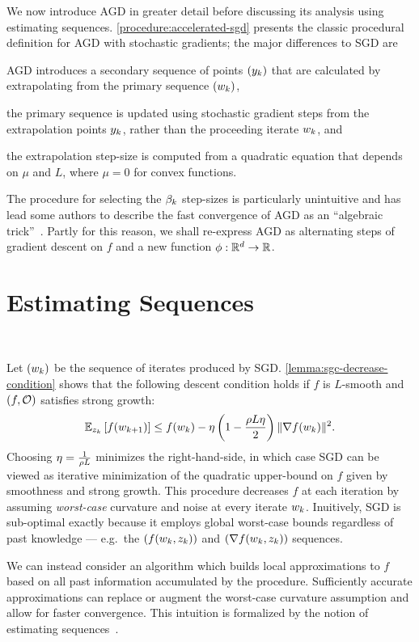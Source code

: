 We now introduce \ac{AGD} in greater detail before discussing its analysis using estimating sequences. 
\autoref{procedure:accelerated-sgd} presents the classic procedural definition for \ac{AGD} with stochastic gradients; the major differences to \ac{SGD} are
\begin{inparaenum}[(i)]
\item \ac{AGD} introduces a secondary sequence of points \( \seq{\yk} \) that are calculated by extrapolating from the primary sequence \( \seq{\wk} \),
\item the primary sequence is updated using stochastic gradient steps from the extrapolation points \( \yk \), rather than the proceeding iterate \( \wk \), and 
\item the extrapolation step-size is computed from a quadratic equation that depends on \( \mu \) and \( L \), where \( \mu = 0 \) for convex functions. 
\end{inparaenum}
The procedure for selecting the \( \betak \) step-sizes is particularly unintuitive and has lead some authors to describe the fast convergence of \ac{AGD} as an ``algebraic trick''~\citep{allen2014linear}.
Partly for this reason, we shall re-express \ac{AGD} as alternating steps of gradient descent on \( f \) and a new function \( \phi : \R^d \rightarrow \R \).


\section{Estimating Sequences}~\label{sec:estimating-sequences}

Let \( \seq{\wk} \) be the sequence of iterates produced by \ac{SGD}.\@
\autoref{lemma:sgc-decrease-condition} shows that the following descent condition holds if \( f \) is \( L \)-smooth and \( \rbr{f, \oracle{}} \) satisfies strong growth:
\[ \Ek\sbr{f(\wkk)} \leq f(\wk) - \eta \rbr{1 - \frac{\sgc L \eta}{2}}\norm{\grad(\wk)}^2. \]
Choosing \( \eta = \frac{1}{\sgc L} \) minimizes the right-hand-side, in which case \ac{SGD} can be viewed as iterative minimization of the quadratic upper-bound on \( f \) given by smoothness and strong growth. 
This procedure decreases \( f \) at each iteration by assuming \emph{worst-case} curvature and noise at every iterate \( \wk \). 
Inuitively, \ac{SGD} is sub-optimal exactly because it employs global worst-case bounds regardless of past knowledge --- e.g.\ the \( \seq{f(\wk, \zk)} \) and \( \seq{\grad(\wk, \zk)} \) sequences. 

We can instead consider an algorithm which builds local approximations to \( f \) based on all past information accumulated by the procedure.
Sufficiently accurate approximations can replace or augment the worst-case curvature assumption and allow for faster convergence. 
This intuition is formalized by the notion of estimating sequences~\citep{nesterov2004lectures}.

